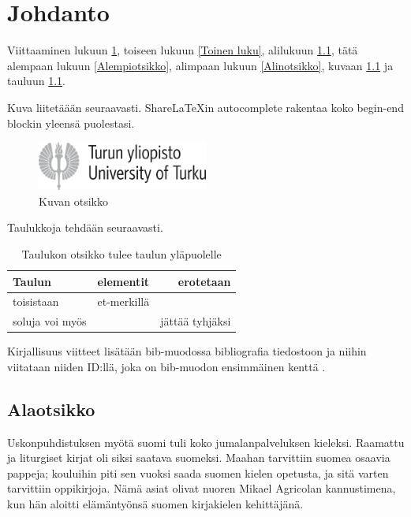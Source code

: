 \chapter{Johdanto}
\label{Johdanto}

Viittaaminen lukuun \ref{Johdanto}, toiseen lukuun \ref{Toinen luku}, alilukuun \ref{Alaotsikko}, tätä alempaan lukuun \ref{Alempiotsikko}, alimpaan lukuun \ref{Alinotsikko}, kuvaan \ref{Kuva esimerkki} ja tauluun \ref{Taulu esimerkki}.

Kuva liitetäään seuraavasti. ShareLaTeXin autocomplete rakentaa koko begin-end blockin yleensä puolestasi.

\begin{figure}
\centering
\includegraphics[width=0.5\textwidth]{kuvat/turun_yliopisto_logo_rgb.png}
\caption{Kuvan otsikko}
\label{Kuva esimerkki}
\end{figure}

Taulukkoja tehdään seuraavasti.

\begin{table}
\centering
\caption{Taulukon otsikko tulee taulun yläpuolelle}
\begin{tabular}{l|c|r|}
 Taulun             &   elementit   & erotetaan \\
 \hline
 toisistaan         &   et-merkillä & \\
 soluja voi myös    &               & jättää tyhjäksi
\end{tabular}
\label{Taulu esimerkki}
\end{table}

Kirjallisuus viitteet lisätään bib-muodossa bibliografia tiedostoon ja niihin viitataan niiden ID:llä, joka on bib-muodon ensimmäinen kenttä \cite{crawley2007write}.

\section{Alaotsikko}
\label{Alaotsikko}

Uskonpuhdistuksen myötä suomi tuli koko jumalanpalveluksen kieleksi. Raamattu ja liturgiset kirjat oli siksi saatava suomeksi. Maahan tarvittiin suomea osaavia pappeja; kouluihin piti sen vuoksi saada suomen kielen opetusta, ja sitä varten tarvittiin oppikirjoja. Nämä asiat olivat nuoren Mikael Agricolan kannustimena, kun hän aloitti elämäntyönsä suomen kirjakielen kehittäjänä.

